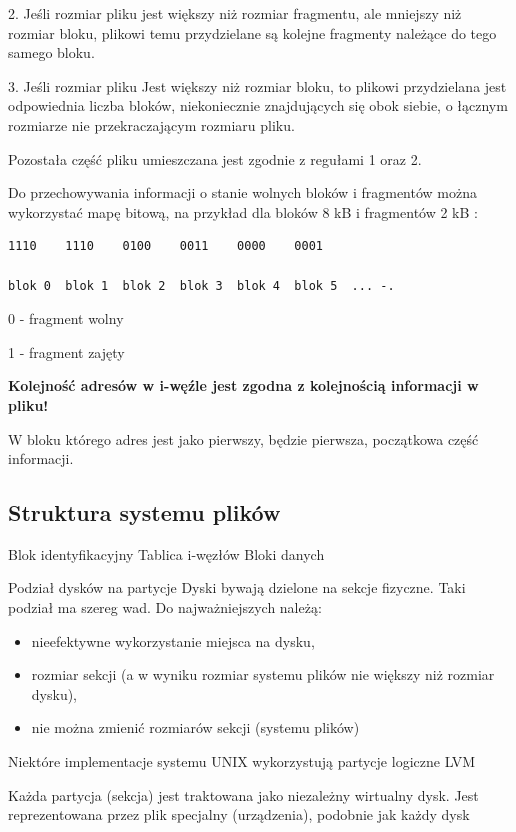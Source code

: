 \documentclass[11pt]{article}
\begin{document}
2. Jeśli rozmiar pliku jest większy niż rozmiar fragmentu, ale mniejszy niż rozmiar bloku,
plikowi temu przydzielane są kolejne fragmenty należące do tego samego bloku.

3. Jeśli rozmiar pliku Jest większy niż rozmiar bloku, to plikowi przydzielana jest
odpowiednia liczba bloków, niekoniecznie znajdujących się obok siebie, o łącznym
rozmiarze nie przekraczającym rozmiaru pliku.

Pozostała część pliku umieszczana jest zgodnie z regułami 1 oraz 2.

Do przechowywania informacji o stanie wolnych bloków i fragmentów można
wykorzystać mapę bitową, na przykład dla bloków 8 kB i fragmentów 2 kB :

\begin{verbatim}
1110    1110    0100    0011    0000    0001

blok 0  blok 1  blok 2  blok 3  blok 4  blok 5  ... -.
\end{verbatim}
0 - fragment wolny

1 - fragment zajęty


\textbf{Kolejność adresów w i-węźle jest zgodna z kolejnością informacji w pliku!}

W bloku którego adres jest jako pierwszy, będzie pierwsza, początkowa część informacji.

\subsection{Struktura systemu plików}

Blok identyfikacyjny Tablica i-węzłów  Bloki danych

Podział dysków na partycje
Dyski bywają dzielone na sekcje
fizyczne. Taki podział ma szereg wad.
Do najważniejszych należą:
\begin{itemize}
\item nieefektywne wykorzystanie miejsca na dysku,
\item rozmiar sekcji (a w wyniku rozmiar systemu plików nie większy niż rozmiar dysku),
\item nie można zmienić rozmiarów sekcji (systemu plików)
\end{itemize}

Niektóre implementacje systemu UNIX wykorzystują partycje logiczne LVM 

Każda partycja (sekcja) jest traktowana jako niezależny wirtualny dysk. Jest reprezentowana przez plik specjalny (urządzenia), podobnie jak każdy dysk
\end{document}
